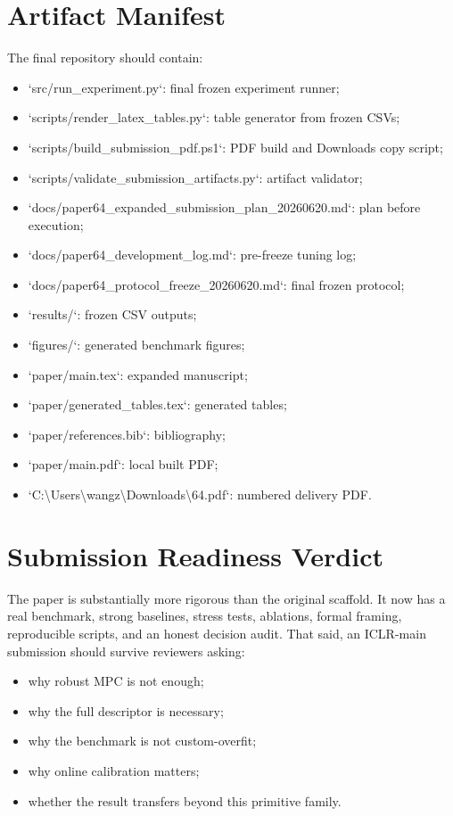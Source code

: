 \documentclass{article}
\begin{document}
\section{Artifact Manifest}

The final repository should contain:

\begin{itemize}
\item `src/run\_experiment.py`: final frozen experiment runner;
\item `scripts/render\_latex\_tables.py`: table generator from frozen CSVs;
\item `scripts/build\_submission\_pdf.ps1`: PDF build and Downloads copy script;
\item `scripts/validate\_submission\_artifacts.py`: artifact validator;
\item `docs/paper64\_expanded\_submission\_plan\_20260620.md`: plan before execution;
\item `docs/paper64\_development\_log.md`: pre-freeze tuning log;
\item `docs/paper64\_protocol\_freeze\_20260620.md`: final frozen protocol;
\item `results/`: frozen CSV outputs;
\item `figures/`: generated benchmark figures;
\item `paper/main.tex`: expanded manuscript;
\item `paper/generated\_tables.tex`: generated tables;
\item `paper/references.bib`: bibliography;
\item `paper/main.pdf`: local built PDF;
\item `C:\textbackslash Users\textbackslash wangz\textbackslash Downloads\textbackslash 64.pdf`: numbered delivery PDF.
\end{itemize}

\section{Submission Readiness Verdict}

The paper is substantially more rigorous than the original scaffold. It now has a real benchmark, strong baselines, stress tests, ablations, formal framing, reproducible scripts, and an honest decision audit. That said, an ICLR-main submission should survive reviewers asking:

\begin{itemize}
\item why robust MPC is not enough;
\item why the full descriptor is necessary;
\item why the benchmark is not custom-overfit;
\item why online calibration matters;
\item whether the result transfers beyond this primitive family.
\end{itemize}
\end{document}
